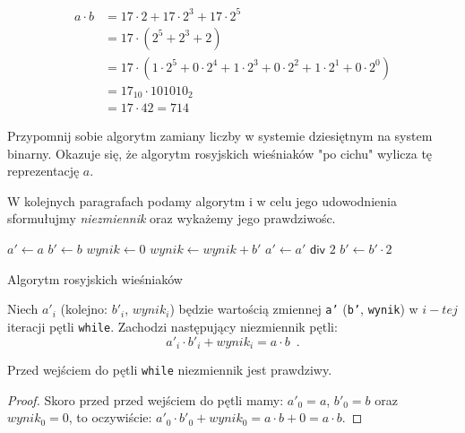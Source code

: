 \begin{equation*} 
\begin{split}
a \cdot b &= 17\cdot2 + 17\cdot2^3 + 17\cdot2^5 \\
&= 17 \cdot ( 2^5 + 2^3 + 2) \\
&= 17 \cdot ( 1 \cdot 2^5 + 0 \cdot 2^4 + 1 \cdot 2^3 + 0 \cdot 2^2 + 1 \cdot 2^1 + 0 \cdot 2^0 ) \\
&=17_{10} \cdot 101010_2 \\
&=17 \cdot 42 = 714
\end{split}
\end{equation*}

Przypomnij sobie algorytm zamiany liczby w systemie dziesiętnym na system binarny.
Okazuje się, że algorytm rosyjskich wieśniaków "po cichu" wylicza tę reprezentację $a$.

W kolejnych paragrafach podamy algorytm i w celu jego udowodnienia sformułujmy \textit{niezmiennik} oraz wykażemy jego prawdziwośc.

\begin{algorithm}[h]
  \DontPrintSemicolon
  
  
  
  $a' \leftarrow a$\;
  $b' \leftarrow b$\;
  $wynik \leftarrow 0$\;
  {
    {
      $wynik \leftarrow wynik + b'$\;
    }
    $a' \leftarrow a' \textsf{ div } 2$\;
    $b' \leftarrow b' \cdot 2$\;
  }
  
  \caption{Algorytm rosyjskich wieśniaków}
  \label{alg-wiesniakow}
\end{algorithm}

\begin{theorem}
Niech $a'_i$ (kolejno: $b'_i$, $wynik_i$) będzie wartością zmiennej \texttt{a'} (\texttt{b'}, \texttt{wynik}) w $i-tej$ iteracji pętli \texttt{while}. Zachodzi następujący niezmiennik pętli:
\[
a'_i \cdot b'_i + wynik_i = a \cdot b \enspace.
\]
\end{theorem}

\begin{lemma}
Przed wejściem do pętli \texttt{while} niezmiennik jest prawdziwy.
\end{lemma}
\begin{proof}
Skoro przed przed wejściem do pętli mamy: $a'_0 = a$, $b'_0 = b$ oraz $wynik_0 = 0$, to oczywiście: $a'_0 \cdot b'_0 + wynik_0 = a \cdot b + 0 = a \cdot b$.
\end{proof}

